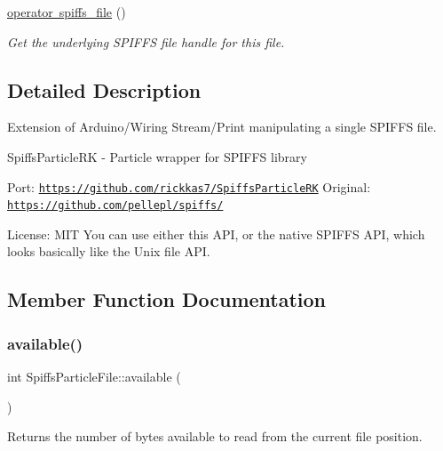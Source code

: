 \begin{DoxyCompactItemize}
\mbox{\label{class_spiffs_particle_file_adc7aa6681c2f95cc2d59a54ef7dad2f9}} 
\mbox{\hyperlink{class_spiffs_particle_file_adc7aa6681c2f95cc2d59a54ef7dad2f9}{operator spiffs\+\_\+file}} ()
\begin{DoxyCompactList}\small\item\em Get the underlying S\+P\+I\+F\+FS file handle for this file. \end{DoxyCompactList}\end{DoxyCompactItemize}


\subsection{Detailed Description}
Extension of Arduino/\+Wiring Stream/\+Print manipulating a single S\+P\+I\+F\+FS file. 

Spiffs\+Particle\+RK -\/ Particle wrapper for S\+P\+I\+F\+FS library

Port\+: \href{https://github.com/rickkas7/SpiffsParticleRK}{\tt https\+://github.\+com/rickkas7/\+Spiffs\+Particle\+RK} Original\+: \href{https://github.com/pellepl/spiffs/}{\tt https\+://github.\+com/pellepl/spiffs/}

License\+: M\+IT You can use either this A\+PI, or the native S\+P\+I\+F\+FS A\+PI, which looks basically like the Unix file A\+PI. 

\subsection{Member Function Documentation}
\mbox{\label{class_spiffs_particle_file_a0f1c61016a86835e325bf231d90f9fbf}} 
\subsubsection{\texorpdfstring{available()}{available()}}
{\footnotesize\ttfamily int Spiffs\+Particle\+File\+::available (\begin{DoxyParamCaption}{ }\end{DoxyParamCaption})\hspace{0.3cm}{\ttfamily [virtual]}}



Returns the number of bytes available to read from the current file position. 

